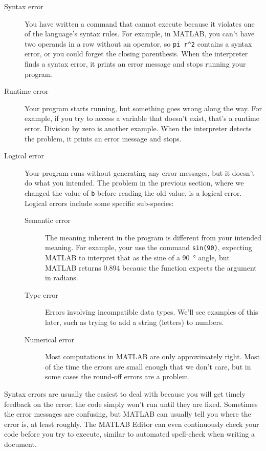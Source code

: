 \begin{description}

\item[Syntax error] You have written a command that cannot execute because it violates one of the language's syntax rules.  For example, in MATLAB, you can't have two operands in a row without an operator, so \lstinline{pi r^2} contains a syntax error, or you could forget the closing parenthesis.  When the interpreter finds a syntax error, it prints an error message and stops running your program.

\item[Runtime error] Your program starts running, but something goes wrong along the way.  For example, if you try to access a variable that doesn't exist, that's a runtime error.  Division by zero is another example.  When the interpreter detects the problem, it prints an error message and stops.

\item[Logical error] Your program runs without generating any error messages, but it doesn't do what you intended.  The problem in the previous section, where we changed the value of \lstinline{b} before reading the old value, is a logical error.  Logical errors include some specific sub-species:
\begin{description}
    \item [Semantic error] The meaning inherent in the program is different from your intended meaning.  For example, your use the command \lstinline{sin(90)}, expecting MATLAB to interpret that as the sine of a \SI{90}{\degree} angle, but MATLAB returns 0.894 because the function expects the argument in radians.
    \item [Type error] Errors involving incompatible data types.  We'll see examples of this later, such as trying to add a string (letters) to numbers.
    \item[Numerical error] Most computations in MATLAB are only approximately right.  Most of the time the errors are small enough that we don't care, but in some cases the round-off errors are a problem.
\end{description}
\end{description}

Syntax errors are usually the easiest to deal with because you will get timely feedback on the error; the code simply won't run until they are fixed.  Sometimes the error messages are confusing, but MATLAB can usually tell you where the error is, at least roughly.  The MATLAB Editor can even continuously check your code before you try to execute, similar to automated spell-check when writing a document.

